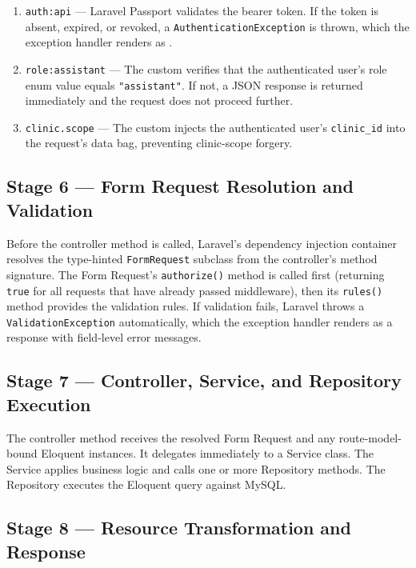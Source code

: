 \begin{enumerate}
  \item \texttt{auth:api} --- Laravel Passport validates the bearer token.
    If the token is absent, expired, or revoked, a
    \texttt{AuthenticationException} is thrown, which the exception
    handler renders as \stunauth{}.
  \item \texttt{role:assistant} --- The custom
     verifies that the authenticated user's
    role enum value equals \texttt{"assistant"}. If not, a \stforbid{}
    JSON response is returned immediately and the request does not
    proceed further.
  \item \texttt{clinic.scope} --- The custom
     injects the authenticated user's
    \texttt{clinic\_id} into the request's data bag, preventing
    clinic-scope forgery.
\end{enumerate}

\subsection{Stage 6 --- Form Request Resolution and Validation}

Before the controller method is called, Laravel's dependency injection
container resolves the type-hinted \texttt{FormRequest} subclass from
the controller's method signature. The Form Request's \texttt{authorize()}
method is called first (returning \texttt{true} for all requests that
have already passed middleware), then its \texttt{rules()} method
provides the validation rules. If validation fails, Laravel throws a
\texttt{ValidationException} automatically, which the exception handler
renders as a \stunproc{} response with field-level error messages.

\subsection{Stage 7 --- Controller, Service, and Repository Execution}

The controller method receives the resolved Form Request and any
route-model-bound Eloquent instances. It delegates immediately to a
Service class. The Service applies business logic and calls one or more
Repository methods. The Repository executes the Eloquent query against
MySQL.

\subsection{Stage 8 --- Resource Transformation and Response}


